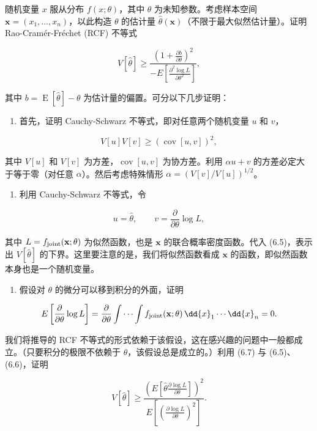 \begin{question}
随机变量 \(x\) 服从分布 \(f(x;\theta)\)，其中 \(\theta\)
为未知参数。考虑样本空间 \(\mathbf{x}=(x_1,\ldots,x_n)\)，以此构造
\(\theta\) 的估计量
\(\hat\theta(\mathbf{x})\)（不限于最大似然估计量）。证明
Rao-Cramér-Fréchet (RCF) 不等式

\[
V[\hat\theta]\ge \frac{\left(1+\frac{\partial b}{\partial\theta}\right)^2}{-E\left[\frac{\partial^2\log L}{\partial\theta^2}\right]},
\]

其中 \(b=\operatorname{E}[\hat\theta]-\theta\) 为估计量的偏置。可分以下几步证明：

\begin{enumerate}
\item
  首先，证明 Cauchy-Schwarz 不等式，即对任意两个随机变量 \(u\) 和
  \(v\)，
\end{enumerate}

\[
V[u]V[v]\ge (\operatorname{cov}[u,v])^2,
\]

其中 \(V[u]\) 和 \(V[v]\) 为方差，\(\operatorname{cov}[u,v]\)
为协方差。利用 \(\alpha u+v\) 的方差必定大于等于零（对任意
\(\alpha\)）。然后考虑特殊情形 \(\alpha=(V[v]/V[u])^{1/2}\)。

\begin{enumerate}[start=2]
\item
  利用 Cauchy-Schwarz 不等式，令
\end{enumerate}

\[
u=\hat\theta,\qquad v=\frac{\partial}{\partial\theta}\log L,
\]

其中 \(L=f_{\rm joint}(\mathbf{x};\theta)\) 为似然函数，也是
\(\mathbf{x}\) 的联合概率密度函数。代入 (6.5)，表示出 \(V[\hat\theta]\)
的下界。这里要注意的是，我们将似然函数看成 \(\mathbf{x}\)
的函数，即似然函数本身也是一个随机变量。

\begin{enumerate}[start=3]
\item
  假设对 \(\theta\) 的微分可以移到积分的外面，证明
\end{enumerate}

\[
E\left[\frac{\partial}{\partial\theta}\log L\right]
=\frac{\partial}{\partial\theta}\int\cdots\int f_{\rm joint}(\mathbf{x};\theta)\,\dd{x}_1\cdots \dd{x}_n=0.
\]

我们将推导的 RCF
不等式的形式依赖于该假设，这在感兴趣的问题中一般都成立。（只要积分的极限不依赖于
\(\theta\)，该假设总是成立的。）利用 (6.7) 与 (6.5)、(6.6)，证明

\[
V[\hat\theta]\ge \frac{\left(E\left[\hat\theta\frac{\partial\log L}{\partial\theta}\right]\right)^2}{E\left[\left(\frac{\partial\log L}{\partial\theta}\right)^2\right]}.
\]


\end{question}
